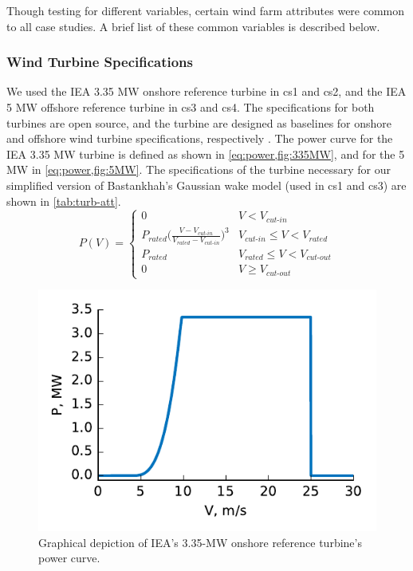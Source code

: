 Though testing for different variables, certain wind farm attributes were common to all case studies.
A brief list of these common variables is described below.

\subsubsection{Wind Turbine Specifications} \label{sec:turb}
	We used the IEA 3.35 MW onshore reference turbine in cs1 and cs2, and the IEA 5 MW offshore reference turbine in cs3 and cs4.
	The specifications for both turbines are open source, and the turbine are designed as baselines for onshore and offshore wind turbine specifications, respectively \cite{NREL335MW,NREL5MW}.
	The power curve for the IEA 3.35 MW turbine is defined as shown in \cref{eq:power,fig:335MW}, and for the 5 MW in \cref{eq:power,fig:5MW}.
	The specifications of the turbine necessary for our simplified version of Bastankhah's Gaussian wake model (used in cs1 and cs3) are shown in \cref{tab:turb-att}.  %
	\begin{equation}\label{eq:power}
		P(V) = 
		\begin{cases} 
			0 & V < V_{\textit{cut-in}} \\
			P_{\textit{rated}}\bigg(\frac{V-V_{\textit{cut-in}}}{V_{\textit{rated}}-V_{\textit{cut-in}}}\bigg)^3 & V_{\textit{cut-in}}\leq V < V_{\textit{rated}} \\
			P_{\textit{rated}} & V_{\textit{rated}} \leq V < V_{\textit{cut-out}} \\
			0 & V \geq V_{\textit{cut-out}}
		\end{cases}
	\end{equation}
	\begin{figure}[H]
	    \centering
	   \includegraphics[]{./figures/power_curve.pdf}
	    \caption{Graphical depiction of IEA's 3.35-MW onshore reference turbine's power curve.}
	    \label{fig:335MW}
	\end{figure}
